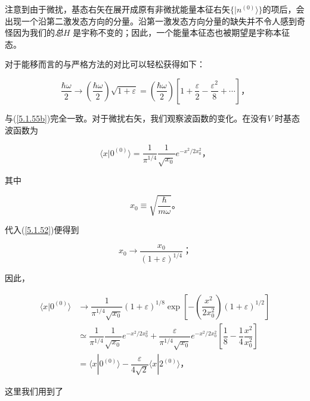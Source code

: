 ﻿\documentclass[UTF8,twoside]{ctexart}
\begin{document}
\noindent 注意到由于微扰，基态右矢在展开成原有非微扰能量本征右矢$\{|n^{(0)}\rangle\}$的项后，会出现一个沿第二激发态方向的分量。沿第一激发态方向分量的缺失并不令人感到奇怪因为我们的\emph{总}$H$ 是宇称不变的；因此，一个能量本征态也被期望是宇称本征态。

对于能移而言的与严格方法的对比可以轻松获得如下：

\begin{equation} \label{5.1.56}
\dfrac{\hbar\omega}{2} \rightarrow \left(\dfrac{\hbar\omega}{2}\right)\sqrt{1+\varepsilon} = \left(\dfrac{\hbar\omega}{2}\right)\left[1+\dfrac{\varepsilon}{2}-\dfrac{\varepsilon^2}{8}+\cdots\right] \text{，}
\end{equation}

\noindent 与(\ref{5.1.55b})完全一致。对于微扰右矢，我们观察波函数的变化。在没有$V$ 时基态波函数为

\begin{equation} \label{5.1.57}
\langle x|0^{(0)}\rangle = \dfrac{1}{\pi^{1/4}}\dfrac{1}{\sqrt{x_0}}e^{-x^2/2x_0^2}\text{，}
\end{equation}

\noindent 其中

\begin{equation} \label{5.1.58}
x_0\equiv\displaystyle\sqrt{\dfrac{\hbar}{m\omega}}\text{。}
\end{equation}

\noindent 代入(\ref{5.1.52})便得到

\begin{equation} \label{5.1.59}
x_0 \rightarrow \dfrac{x_0}{(1+\varepsilon)^{1/4}}\text{；}
\end{equation}

\noindent 因此，

\begin{equation} \label{5.1.60}
\begin{split}
\langle x|0^{(0)}\rangle&\rightarrow\dfrac{1}{\pi^{1/4}\sqrt{x_0}}(1 + \varepsilon)^{1/8}\exp\left[-\left(\dfrac{x^2}{2x_0^2}\right)(1+\varepsilon)^{1/2}\right]\\
&\simeq\dfrac{1}{\pi^{1/4}}\dfrac{1}{\sqrt{x_0}}e^{-x^2/2x_0^2}+ \dfrac{\varepsilon}{\pi^{1/4}\sqrt{x_0}} e^{-x^2/2x_0^2}\left[\dfrac{1}{8}-\dfrac{1}{4}\dfrac{x^2}{x_0^2}\right] \\
& = \langle x|0^{(0)}\rangle-\dfrac{\varepsilon}{4\sqrt{2}}\langle x|2^{(0)}\rangle\text{，}
\end{split}
\end{equation}

\noindent 这里我们用到了
\end{document}
